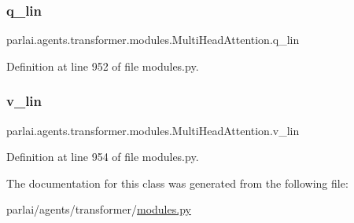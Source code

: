 \subsubsection{\texorpdfstring{q\+\_\+lin}{q\_lin}}
{\footnotesize\ttfamily parlai.\+agents.\+transformer.\+modules.\+Multi\+Head\+Attention.\+q\+\_\+lin}



Definition at line 952 of file modules.\+py.

\mbox{\label{classparlai_1_1agents_1_1transformer_1_1modules_1_1MultiHeadAttention_a1b1c33915c80f894221dfd4f0a0a2896}} 
\subsubsection{\texorpdfstring{v\+\_\+lin}{v\_lin}}
{\footnotesize\ttfamily parlai.\+agents.\+transformer.\+modules.\+Multi\+Head\+Attention.\+v\+\_\+lin}



Definition at line 954 of file modules.\+py.



The documentation for this class was generated from the following file\+:\begin{DoxyCompactItemize}
\item 
parlai/agents/transformer/\hyperlink{parlai_2agents_2transformer_2modules_8py}{modules.\+py}\end{DoxyCompactItemize}
